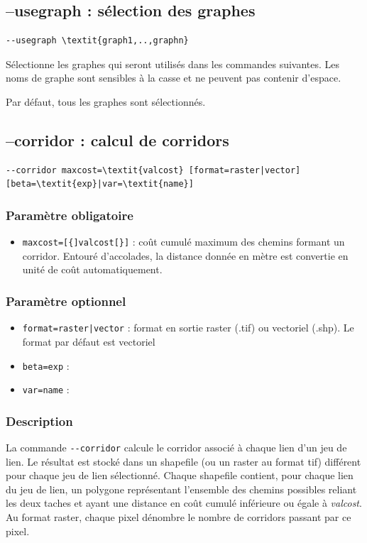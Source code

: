 \documentclass[a4paper,10pt]{report}
\begin{document}
\subsection{--usegraph : sélection des graphes}
\label{usegraph}
\begin{Verbatim}[commandchars=\\\{\}]
--usegraph \textit{graph1,..,graphn}
\end{Verbatim}
Sélectionne les graphes qui seront utilisés dans les commandes suivantes.
Les noms de graphe sont sensibles à la casse et ne peuvent pas contenir d'espace.

Par défaut, tous les graphes sont sélectionnés.

\subsection{--corridor : calcul de corridors}
\begin{Verbatim}[commandchars=\\\{\}]
--corridor maxcost=\textit{valcost} [format=raster|vector] [beta=\textit{exp}|var=\textit{name}]
\end{Verbatim}

\subsubsection{Paramètre obligatoire}
\begin{itemize}
	\item \verb|maxcost=[{]valcost[}]| : coût cumulé maximum des chemins formant un corridor. Entouré d'accolades, la distance donnée en mètre est convertie en unité de coût automatiquement.
\end{itemize}

\subsubsection{Paramètre optionnel}
\begin{itemize}
	\item \verb+format=raster|vector+ : format en sortie raster (.tif) ou vectoriel (.shp). Le format par défaut est vectoriel
	\item \verb|beta=exp| : 
	\item \verb|var=name| : 	
\end{itemize}

\subsubsection{Description}
La commande \verb|--corridor| calcule le corridor associé à chaque lien d'un jeu de lien.
Le résultat est stocké dans un shapefile (ou un raster au format tif) différent pour chaque jeu de lien sélectionné. Chaque shapefile contient, pour chaque lien du jeu de lien, un polygone représentant l'ensemble des chemins possibles reliant les deux taches et ayant une distance en coût cumulé inférieure ou égale à \textit{valcost}.
Au format raster, chaque pixel dénombre le nombre de corridors passant par ce pixel.
\end{document}
